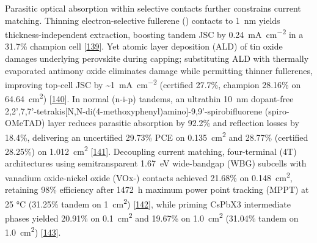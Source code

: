 \documentclass[
  11pt,
]{article}
\begin{document}
Parasitic optical absorption within selective contacts further
constrains current matching. Thinning electron-selective fullerene
() contacts to \qty{1}{\nano\meter} yields thickness-independent
extraction, boosting tandem JSC by
\qty{0.24}{\milli\ampere\per\centi\meter\squared} in a 31.7\% champion
cell {[}\href{https://doi.org/10.1021/acsenergylett.5c04082}{139}{]}.
Yet atomic layer deposition (ALD) of tin oxide damages underlying
perovskite during  capping; substituting ALD with thermally
evaporated antimony oxide eliminates damage while permitting thinner
fullerenes, improving top-cell JSC by
\textasciitilde{}\qty{1}{\milli\ampere\per\centi\meter\squared}
(certified 27.7\%, champion 28.16\% on
\qty{64.64}{\centi\meter\squared})
{[}\href{https://doi.org/10.1038/s41467-026-70848-8}{140}{]}. In normal
(n-i-p) tandems, an ultrathin \qty{10}{\nano\meter} dopant-free
2,2',7,7'-tetrakis{[}N,N-di(4-methoxyphenyl)amino{]}-9,9'-spirobifluorene
(spiro-OMeTAD) layer reduces parasitic absorption by 92.2\% and
reflection losses by 18.4\%, delivering an uncertified 29.73\% PCE on
\qty{0.135}{\centi\meter\squared} and 28.77\% (certified 28.25\%) on
\qty{1.012}{\centi\meter\squared}
{[}\href{https://doi.org/10.1007/s40820-025-01962-3}{141}{]}. Decoupling
current matching, four-terminal (4T) architectures using semitransparent
\qty{1.67}{\electronvolt} wide-bandgap (WBG) subcells with vanadium
oxide-nickel oxide (VOx-) contacts achieved 21.68\% on
\qty{0.148}{\centi\meter\squared}, retaining 98\% efficiency after
\qty{1472}{\hour} maximum power point tracking (MPPT) at 25 °C (31.25\%
tandem on \qty{1}{\centi\meter\squared})
{[}\href{https://doi.org/10.1002/aenm.71036}{142}{]}, while priming
CsPbX3 intermediate phases yielded 20.91\% on
\qty{0.1}{\centi\meter\squared} and 19.67\% on
\qty{1.0}{\centi\meter\squared} (31.04\% tandem on
\qty{1.0}{\centi\meter\squared})
{[}\href{https://doi.org/10.1038/s41467-026-72094-4}{143}{]}.
\end{document}
